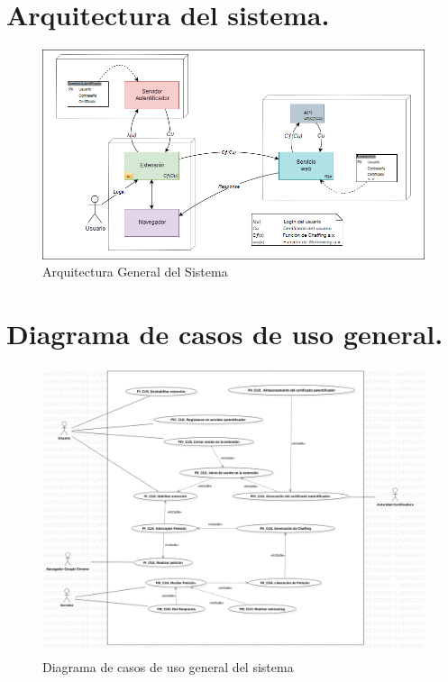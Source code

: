 \documentclass[12pt, a4paper, titlepage]{report}
\begin{document}
    	\section{Arquitectura del sistema.}
            \begin{figure}[H]
        		\begin{center}
        		\includegraphics[width=15cm]{./imagenes/Analisis/ArquitecturaSistema.png}
        		\caption{Arquitectura General del Sistema}
	            \end{center}
	        \end{figure}    	
    	
	    \section{Diagrama de casos de uso general.}
	         \begin{figure}[H]
        		\begin{center}
        		\includegraphics[width=13cm]{./imagenes/Analisis/UCD_General.png}
        		\caption{Diagrama de casos de uso general del sistema}
	            \end{center}
	        \end{figure}   
	        
\end{document}
